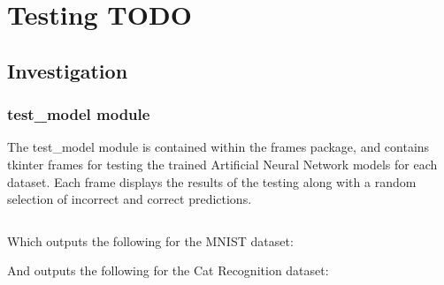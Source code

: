 \documentclass[./project-report/src/latex/project-report.tex]{subfiles}
\begin{document}
\maketitle

\section{Testing TODO}

\subsection{Investigation}

\subsubsection{test\_model module}

The test\_model module is contained within the frames package, and contains tkinter frames for testing the trained Artificial Neural Network models for each dataset. 
Each frame displays the results of the testing along with a random selection of incorrect and correct predictions.

\inputminted{python}{./school_project/frames/test_model.py}

Which outputs the following for the MNIST dataset:

\pagebreak

\begin{figure}[h!]
\centering
{}
\end{figure}

And outputs the following for the Cat Recognition dataset:
\end{document}
